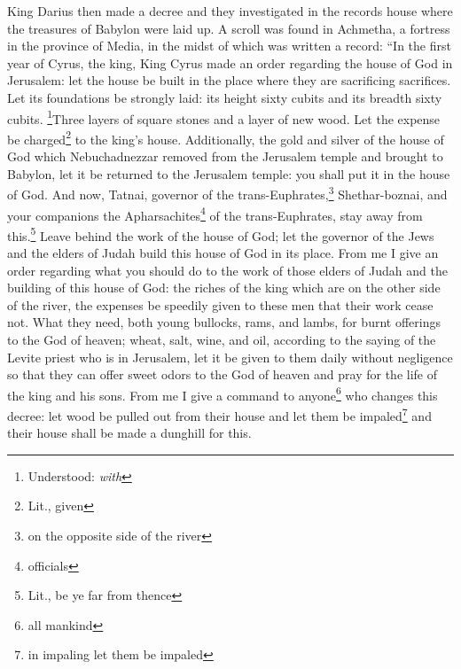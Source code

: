 

\begin{enumerate*}[mode=unboxed]
     King Darius then made a decree and they investigated in the records house where the treasures of Babylon were laid up.%
     A scroll was found in Achmetha, a fortress in the province of Media, in the midst of which was written a record:%
     ``In the first year of Cyrus, the king, King Cyrus made an order regarding the house of God in Jerusalem: let the house be built in the place where they are sacrificing sacrifices. Let its foundations be strongly laid: its height sixty cubits and its breadth sixty cubits.%
     \footnote{Understood: \textit{with}}Three layers of square stones and a layer of new wood. Let the expense be charged\footnote{Lit., given} to the king's house.%
     Additionally, the gold and silver of the house of God which Nebuchadnezzar removed from the Jerusalem temple and brought to Babylon, let it be returned to the Jerusalem temple: you shall put it in the house of God.%
     And now, Tatnai, governor of the trans-Euphrates,\footnote{on the opposite side of the river} Shethar-boznai, and your companions the Apharsachites\footnote{officials} of the trans-Euphrates, stay away from this.\footnote{Lit., be ye far from thence}%
     Leave behind the work of the house of God; let the governor of the Jews and the elders of Judah build this house of God in its place.%
     From me I give an order regarding what you should do to the work of those elders of Judah and the building of this house of God: the riches of the king which are on the other side of the river, the expenses be speedily given to these men that their work cease not.%
     What they need, both young bullocks, rams, and lambs, for burnt offerings to the God of heaven; wheat, salt, wine, and oil, according to the saying of the Levite priest who is in Jerusalem, let it be given to them daily without negligence%
     so that they can offer sweet odors to the God of heaven and pray for the life of the king and his sons.%
     From me I give a command to anyone\footnote{all mankind} who changes this decree: let wood be pulled out from their house and let them be impaled\footnote{in impaling let them be impaled} and their house shall be made a dunghill for this.%

\end{enumerate*}
